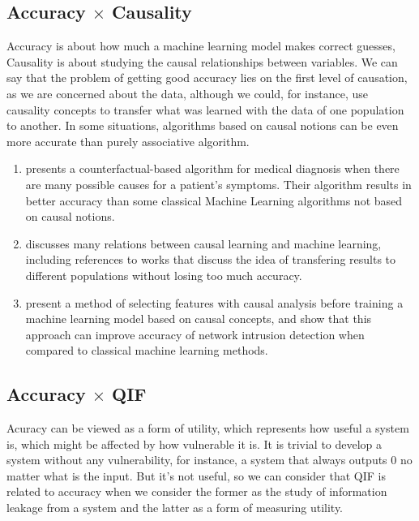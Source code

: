 \subsection{Accuracy $\times$ Causality}

Accuracy is about how much a machine learning model makes correct guesses, Causality is about studying the causal relationships between variables. We can say that the problem of getting good accuracy lies on the first level of causation, as we are concerned about the data, although we could, for instance, use causality concepts to transfer what was learned with the data of one population to another. In some situations, algorithms based on causal notions can be even more accurate than purely associative algorithm.

\begin{enumerate}
    \item \cite{richens2020improving} presents a counterfactual-based algorithm for medical diagnosis when there are many possible causes for a patient's symptoms. Their algorithm results in better accuracy than some classical Machine Learning algorithms not based on causal notions.
    \item \cite{scholkopf2022causality} discusses many relations between causal learning and machine learning, including references to works that discuss the idea of transfering results to different populations without losing too much accuracy.
    \item \cite{zeng2021improving} present a method of selecting features with causal analysis before training a machine learning model based on causal concepts, and show that this approach can improve accuracy of network intrusion detection when compared to classical machine learning methods.
\end{enumerate}

\subsection{Accuracy $\times$ QIF}

Acuracy can be viewed as a form of utility, which represents how useful a system is, which might be affected by how vulnerable it is. It is trivial to develop a system without any vulnerability, for instance, a system that always outputs $0$ no matter what is the input. But it's not useful, so we can consider that QIF is related to accuracy when we consider the former as the study of information leakage from a system and the latter as a form of measuring utility.

